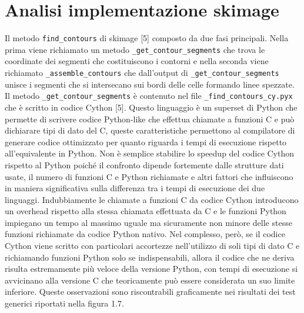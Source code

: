 \documentclass[12pt,a4paper]{report}
\begin{document}
\section{Analisi implementazione skimage}
Il metodo \verb|find_contours| di skimage [5] composto da due fasi principali. Nella prima viene richiamato un metodo \verb|_get_contour_segments| che trova le coordinate dei segmenti che costituiscono i contorni e nella seconda viene richiamato \verb|_assemble_contours| che dall'output di \verb|_get_contour_segments| unisce i segmenti che si intersecano sui bordi delle celle formando linee spezzate. \newline
Il metodo \verb|_get_contour_segments| è contenuto nel file \verb|_find_contours_cy.pyx| che è scritto in codice Cython [5]. Questo linguaggio è un superset di Python che permette di scrivere codice Python-like che effettua chiamate a funzioni C e può dichiarare tipi di dato del C, queste caratteristiche permettono al compilatore di generare codice ottimizzato per quanto riguarda i tempi di esecuzione rispetto all'equivalente in Python. \newline
Non è semplice stabilire lo speedup del codice Cython rispetto al Python poiché il confronto dipende fortemente dalle strutture dati usate, il numero di funzioni C e Python richiamate e altri fattori che influiscono in maniera significativa sulla differenza tra i tempi di esecuzione dei due linguaggi. Indubbiamente le chiamate a funzioni C da codice Cython introducono un overhead rispetto alla stessa chiamata effettuata da C e le funzioni Python impiegano un tempo al massimo uguale ma sicuramente non minore delle stesse funzioni richiamate da codice Python nativo. \newline
Nel complesso, però, se il codice Cython viene scritto con particolari accortezze nell'utilizzo di soli tipi di dato C e richiamando funzioni Python solo se indispensabili, allora il codice che ne deriva risulta estremamente più veloce della versione Python, con tempi di esecuzione si avvicinano alla versione C che teoricamente può essere considerata un suo limite inferiore. Queste osservazioni sono riscontrabili graficamente nei risultati dei test generici riportati nella figura 1.7. 
\end{document}
